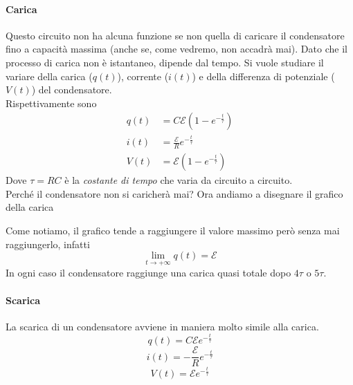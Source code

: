 \paragraph{Carica}
Questo circuito non ha alcuna funzione se non quella di caricare il condensatore fino a capacità 
massima (anche se, come vedremo, non accadrà mai). Dato che il processo di carica non è istantaneo,
dipende dal tempo. Si vuole studiare il variare della carica ($q(t)$), corrente ($i(t)$) e
della differenza di potenziale ($V(t)$) del condensatore.\\
Rispettivamente sono
\begin{align*}
  q(t)&=C\mathcal{E}\left(1-e^{-\frac{t}{\tau}}\right)\\
  i(t)&=\frac{\mathcal{E}}{R}e^{-\frac{t}{\tau}}\\
  V(t)&=\mathcal{E}\left(1-e^{-\frac{t}{\tau}}\right)
\end{align*}
Dove $\tau=RC$ è la \emph{costante di tempo} che varia da circuito a circuito.\\ [\baselineskip]
Perché il condensatore non si caricherà mai? Ora andiamo
a disegnare il grafico della carica
\begin{center}
\end{center}
Come notiamo, il grafico tende a raggiungere il valore massimo però senza mai raggiungerlo,
infatti
\begin{equation*}
  \lim\limits_{t\to+\infty}q(t) = \mathcal{E}
\end{equation*}
In ogni caso il condensatore raggiunge una carica quasi totale dopo $4\tau$ o $5\tau$.

\paragraph{Scarica}
La scarica di un condensatore avviene in maniera molto simile alla carica.
\begin{equation*}
  q(t) = C\mathcal{E}e^{-\frac{t}{\tau}}
\end{equation*}
\begin{equation*}
  i(t) = -\frac{\mathcal{E}}{R}e^{-\frac{t}{\tau}}
\end{equation*}
\begin{equation*}
  V(t) = \mathcal{E}e^{-\frac{t}{\tau}}
\end{equation*}


